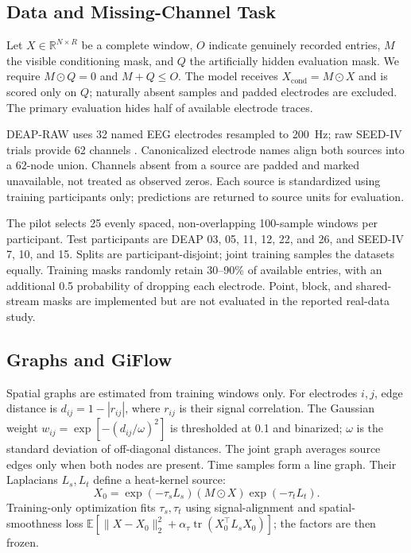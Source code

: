 \documentclass{article}
\begin{document}
\subsection{Data and Missing-Channel Task}

Let $X\in\mathbb{R}^{N\times R}$ be a complete window, $O$ indicate
genuinely recorded entries, $M$ the visible conditioning mask, and $Q$ the
artificially hidden evaluation mask. We require $M\odot Q=0$ and
$M+Q\leq O$. The model receives $X_{\mathrm{cond}}=M\odot X$ and is scored
only on $Q$; naturally absent samples and padded electrodes are excluded.
The primary evaluation hides half of available electrode traces.

DEAP-RAW uses 32 named EEG electrodes resampled to 200~Hz; raw SEED-IV
trials provide 62 channels \cite{koelstra2012deap,zheng2019emotionmeter}.
Canonicalized electrode names align both sources into a 62-node union.
Channels absent from a source are padded and marked unavailable, not treated
as observed zeros. Each source is standardized using training participants
only; predictions are returned to source units for evaluation.

The pilot selects 25 evenly spaced, non-overlapping 100-sample windows per
participant. Test participants are DEAP 03, 05, 11, 12, 22, and 26, and
SEED-IV 7, 10, and 15. Splits are participant-disjoint; joint training
samples the datasets equally. Training masks randomly retain 30--90\% of
available entries, with an additional 0.5 probability of dropping each
electrode. Point, block, and shared-stream masks are implemented but are not
evaluated in the reported real-data study.

\subsection{Graphs and GiFlow}

Spatial graphs are estimated from training windows only. For electrodes
$i,j$, edge distance is $d_{ij}=1-|r_{ij}|$, where $r_{ij}$ is their
signal correlation. The Gaussian weight
$w_{ij}=\exp[-(d_{ij}/\omega)^2]$ is thresholded at 0.1 and binarized;
$\omega$ is the standard deviation of off-diagonal distances. The joint
graph averages source edges only when both nodes are present. Time samples
form a line graph. Their Laplacians $L_s,L_t$ define a heat-kernel source:
\begin{equation}
X_0=\exp(-\tau_sL_s)(M\odot X)\exp(-\tau_tL_t).
\label{eq:source}
\end{equation}
Training-only optimization fits $\tau_s,\tau_t$ using signal-alignment and
spatial-smoothness loss
$\mathbb{E}[\|X-X_0\|_2^2+\alpha_\tau
\operatorname{tr}(X_0^\top L_sX_0)]$; the factors are then frozen.
\end{document}
